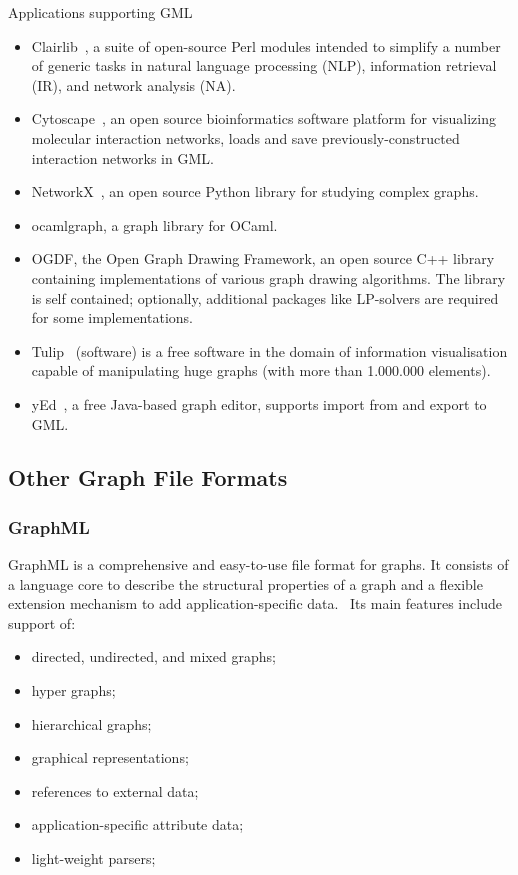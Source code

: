Applications supporting GML~\cite{GML_wiki}

\begin{itemize}
\item Clairlib~\cite{clairlib}, a suite of open-source Perl modules intended to simplify a number of generic tasks in natural language processing (NLP), information retrieval (IR), and network analysis (NA).
\item Cytoscape~\cite{Cytoscape}, an open source bioinformatics software platform for visualizing molecular interaction networks, loads and save previously-constructed interaction networks in GML.
\item NetworkX~\cite{NetworkX}, an open source Python library for studying complex graphs.
\item ocamlgraph\cite{ocamlgraph}, a graph library for OCaml.
\item OGDF\cite{OGDF}, the Open Graph Drawing Framework, an open source C++ library containing implementations of various graph drawing algorithms. The library is self contained; optionally, additional packages like LP-solvers are required for some implementations.
\item Tulip~\cite{Tulip} (software) is a free software in the domain of information visualisation capable of manipulating huge graphs (with more than 1.000.000 elements).
\item yEd~\cite{yed}, a free Java-based graph editor, supports import from and export to GML.
\end{itemize}

\subsection{Other Graph File Formats}

\subsubsection{GraphML}
GraphML is a comprehensive and easy-to-use file format for graphs. It consists of a language core to describe the structural properties of a graph and a flexible extension mechanism to add application-specific data.~\cite{GraphML} Its main features include support of:
\begin{itemize}
\item directed, undirected, and mixed graphs;
\item hyper graphs;
\item hierarchical graphs;
\item graphical representations;
\item references to external data;
\item application-specific attribute data;
\item light-weight parsers;
\end{itemize}


